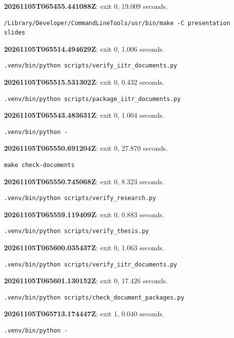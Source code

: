 \noindent\textbf{20261105T065455.441088Z}: exit 0, 19.009 seconds.
\begin{lstlisting}[numbers=none]
/Library/Developer/CommandLineTools/usr/bin/make -C presentation slides
\end{lstlisting}

\noindent\textbf{20261105T065514.494629Z}: exit 0, 1.006 seconds.
\begin{lstlisting}[numbers=none]
.venv/bin/python scripts/verify_iitr_documents.py
\end{lstlisting}

\noindent\textbf{20261105T065515.531302Z}: exit 0, 0.432 seconds.
\begin{lstlisting}[numbers=none]
.venv/bin/python scripts/package_iitr_documents.py
\end{lstlisting}

\noindent\textbf{20261105T065543.483631Z}: exit 0, 1.004 seconds.
\begin{lstlisting}[numbers=none]
.venv/bin/python -
\end{lstlisting}

\noindent\textbf{20261105T065550.691204Z}: exit 0, 27.870 seconds.
\begin{lstlisting}[numbers=none]
make check-documents
\end{lstlisting}

\noindent\textbf{20261105T065550.745068Z}: exit 0, 8.323 seconds.
\begin{lstlisting}[numbers=none]
.venv/bin/python scripts/verify_research.py
\end{lstlisting}

\noindent\textbf{20261105T065559.119409Z}: exit 0, 0.883 seconds.
\begin{lstlisting}[numbers=none]
.venv/bin/python scripts/verify_thesis.py
\end{lstlisting}

\noindent\textbf{20261105T065600.035437Z}: exit 0, 1.063 seconds.
\begin{lstlisting}[numbers=none]
.venv/bin/python scripts/verify_iitr_documents.py
\end{lstlisting}

\noindent\textbf{20261105T065601.130152Z}: exit 0, 17.426 seconds.
\begin{lstlisting}[numbers=none]
.venv/bin/python scripts/check_document_packages.py
\end{lstlisting}

\noindent\textbf{20261105T065713.174447Z}: exit 1, 0.040 seconds.
\begin{lstlisting}[numbers=none]
.venv/bin/python -
\end{lstlisting}


